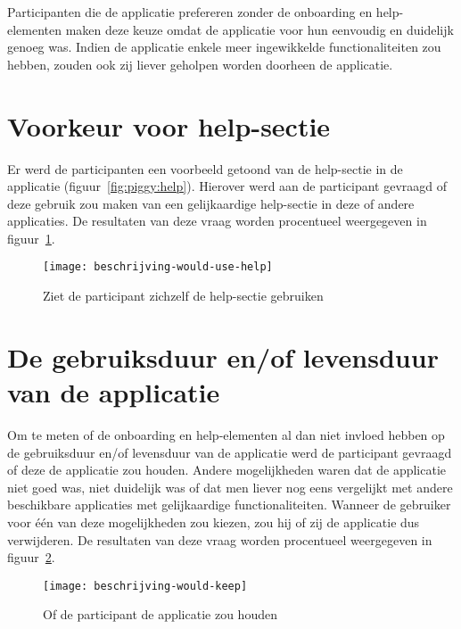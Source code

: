 Participanten die de applicatie prefereren zonder de onboarding en help-elementen maken deze keuze omdat de applicatie voor hun eenvoudig en duidelijk genoeg was. Indien de applicatie enkele meer ingewikkelde functionaliteiten zou hebben, zouden ook zij liever geholpen worden doorheen de applicatie.

\section{Voorkeur voor help-sectie}
\label{sec:voorkeur-help}

Er werd de participanten een voorbeeld getoond van de help-sectie in de applicatie (figuur~\ref{fig:piggy:help}). Hierover werd aan de participant gevraagd of deze gebruik zou maken van een gelijkaardige help-sectie in deze of andere applicaties. De resultaten van deze vraag worden procentueel weergegeven in figuur~\ref{fig:beschrijving-would-use-help}.

\begin{figure}[h]
    \centering
    \texttt{[image: beschrijving-would-use-help]}
    \caption{Ziet de participant zichzelf de help-sectie gebruiken}
    \label{fig:beschrijving-would-use-help}
\end{figure}

\section{De gebruiksduur en/of levensduur van de applicatie}
\label{sec:gebruiksduur}

Om te meten of de onboarding en help-elementen al dan niet invloed hebben op de gebruiksduur en/of levensduur van de applicatie werd de participant gevraagd of deze de applicatie zou houden. Andere mogelijkheden waren dat de applicatie niet goed was, niet duidelijk was of dat men liever nog eens vergelijkt met andere beschikbare applicaties met gelijkaardige functionaliteiten. Wanneer de gebruiker voor één van deze mogelijkheden zou kiezen, zou hij of zij de applicatie dus verwijderen. De resultaten van deze vraag worden procentueel weergegeven in figuur~\ref{fig:beschrijving-would-keep}.

\begin{figure}[h]
    \centering
    \texttt{[image: beschrijving-would-keep]}
    \caption{Of de participant de applicatie zou houden}
    \label{fig:beschrijving-would-keep}
\end{figure}
